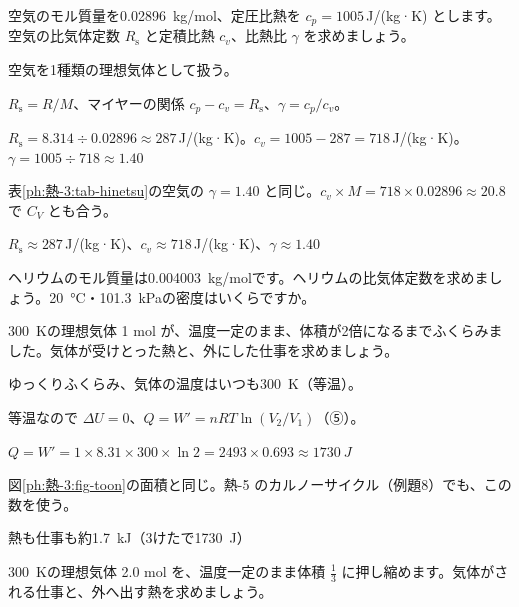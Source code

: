 \begin{reidai}[空気の比気体定数と比熱]
\label{ph:熱-3:ex9}空気のモル質量を\qty{0.02896}{kg/mol}、定圧比熱を $c_p=1005$\,J/(kg·K) とします。空気の比気体定数 $R_{\mathrm s}$ と定積比熱 $c_v$、比熱比 $\gamma$ を求めましょう。
\par{} 空気を1種類の理想気体として扱う。
\par\kangaekata $R_{\mathrm s}=R/M$、マイヤーの関係 $c_p-c_v=R_{\mathrm s}$、$\gamma=c_p/c_v$。
\par\shiki $R_{\mathrm s}=8.314\div0.02896\approx287$\,J/(kg·K)。$c_v=1005-287=718$\,J/(kg·K)。$\gamma=1005\div718\approx1.40$
\par{} 表\ref{ph:熱-3:tab-hinetsu}の空気の $\gamma=1.40$ と同じ。$c_v\times M=718\times0.02896\approx20.8$ で $C_V$ とも合う。
\par\kotae $R_{\mathrm s}\approx287$\,J/(kg·K)、$c_v\approx718$\,J/(kg·K)、$\gamma\approx1.40$
\end{reidai}
\begin{jibun}
ヘリウムのモル質量は\qty{0.004003}{kg/mol}です。ヘリウムの比気体定数を求めましょう。\qty{20}{\celsius}・\qty{101.3}{kPa}の密度はいくらですか。
\end{jibun}

\begin{reidai}[温度一定でふくらむ気体]
\label{ph:熱-3:ex10}\qty{300}{K}の理想気体 1 mol が、温度一定のまま、体積が2倍になるまでふくらみました。気体が受けとった熱と、外にした仕事を求めましょう。
\par{} ゆっくりふくらみ、気体の温度はいつも\qty{300}{K}（等温）。
\par\kangaekata 等温なので $\Delta U=0$、$Q=W'=nRT\ln(V_2/V_1)$（⑤）。
\par\shiki $Q=W'=1\times8.31\times300\times\ln2=2493\times0.693\approx\qty{1730}{J}$
\par{} 図\ref{ph:熱-3:fig-toon}の面積と同じ。熱-5 のカルノーサイクル（例題8）でも、この数を使う。
\par\kotae 熱も仕事も約\qty{1.7}{kJ}（3けたで\qty{1730}{J}）
\end{reidai}
\begin{jibun}
\qty{300}{K}の理想気体 2.0 mol を、温度一定のまま体積 $\tfrac{1}{3}$ に押し縮めます。気体がされる仕事と、外へ出す熱を求めましょう。
\end{jibun}

